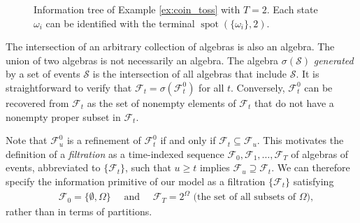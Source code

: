 \documentclass[\topdir/lecture\_notes.tex]{subfiles}
\begin{document}
\begin{figure}[htbp] %
    \centering %
    \caption{Information tree of Example \ref{ex:coin_toss} with \(T=2\). Each state \(\omega_{i}\) can be identified with the terminal \(\operatorname{spot}(\{\omega_{i}\}, 2)\).}
    \label{fig:coin_toss}
\end{figure}

The intersection of an arbitrary collection of algebras is also an algebra. The union of two algebras is not necessarily an algebra. The algebra \(\sigma(\mathcal{S})\) \emph{generated} by a set of events \(\mathcal{S}\) is the intersection of all algebras that include \(\mathcal{S}\). It is straightforward to verify that \(\mathcal{F}_{t}=\sigma(\mathcal{F}_{t}^{0})\) for all \(t\). Conversely, \(\mathcal{F}_{t}^{0}\) can be recovered from \(\mathcal{F}_{t}\) as the set of nonempty elements of \(\mathcal{F}_{t}\) that do not have a nonempty proper subset in \(\mathcal{F}_{t}\).

Note that \(\mathcal{F}_{u}^{0}\) is a refinement of \(\mathcal{F}_{t}^{0}\) if and only if \(\mathcal{F}_{t} \subseteq \mathcal{F}_{u}\). This motivates the definition of a \emph{filtration} as a time-indexed sequence \(\mathcal{F}_{0}, \mathcal{F}_{1}, \ldots, \mathcal{F}_{T}\) of algebras of events, abbreviated to \(\{\mathcal{F}_{t}\}\), such that \(u \geq t\) implies \(\mathcal{F}_{u} \supseteq \mathcal{F}_{t}\). We can therefore specify the information primitive of our model as a filtration \(\{\mathcal{F}_{t}\}\) satisfying
\begin{align}
\quad \mathcal{F}_{0}=\{\emptyset, \Omega\} \quad \text{ and } \quad \mathcal{F}_{T}=2^{\Omega} \text{ (the set of all subsets of \(\Omega\))}, \label{eq:filtration_boundary_conditions}
\end{align}
rather than in terms of partitions. 
\end{document}
